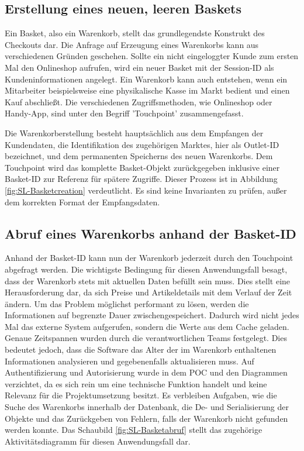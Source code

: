 \subsection{Erstellung eines neuen, leeren Baskets}

Ein Basket, also ein Warenkorb, stellt das grundlegendste Konstrukt des Checkouts dar. Die Anfrage auf Erzeugung eines Warenkorbs kann aus verschiedenen Gründen geschehen. Sollte ein nicht eingeloggter Kunde zum ersten Mal den Onlineshop aufrufen, wird ein neuer Basket mit der Session-ID als Kundeninformationen angelegt. Ein Warenkorb kann auch entstehen, wenn ein Mitarbeiter beispielsweise eine physikalische Kasse im Markt bedient und einen Kauf abschließt. Die verschiedenen Zugriffsmethoden, wie Onlineshop oder Handy-App, sind unter den Begriff 'Touchpoint' zusammengefasst.

Die Warenkorberstellung besteht hauptsächlich aus dem Empfangen der Kundendaten, die Identifikation des zugehörigen Marktes, hier als Outlet-ID bezeichnet, und dem permanenten Speicherns des neuen Warenkorbs. Dem Touchpoint wird das komplette Basket-Objekt zurückgegeben inklusive einer Basket-ID zur Referenz für spätere Zugriffe. Dieser Prozess ist in Abbildung \ref{fig:SL-Basketcreation} verdeutlicht. Es sind keine Invarianten zu prüfen, außer dem korrekten Format der Empfangsdaten.


\subsection{Abruf eines Warenkorbs anhand der Basket-ID}

Anhand der Basket-ID kann nun der Warenkorb jederzeit durch den Touchpoint abgefragt werden. Die wichtigste Bedingung für diesen Anwendungsfall besagt, dass der Warenkorb stets mit aktuellen Daten befüllt sein muss. Dies stellt eine Herausforderung dar, da sich Preise und Artikeldetails mit dem Verlauf der Zeit ändern. Um das Problem möglichst performant zu lösen, werden die Informationen auf begrenzte Dauer zwischengespeichert. Dadurch wird nicht jedes Mal das externe System aufgerufen, sondern die Werte aus dem Cache geladen. Genaue Zeitspannen wurden durch die verantwortlichen Teams festgelegt. Dies bedeutet jedoch, dass die Software das Alter der im Warenkorb enthaltenen Informationen analysieren und gegebenenfalls aktualisieren muss. Auf Authentifizierung und Autorisierung wurde in dem POC und den Diagrammen verzichtet, da es sich rein um eine technische Funktion handelt und keine Relevanz für die Projektumsetzung besitzt. Es verbleiben Aufgaben, wie die Suche des Warenkorbs innerhalb der Datenbank, die De- und Serialisierung der Objekte und das Zurückgeben von Fehlern, falls der Warenkorb nicht gefunden werden konnte. Das Schaubild \ref{fig:SL-Basketabruf} stellt das zugehörige Aktivitätsdiagramm für diesen Anwendungsfall dar.

